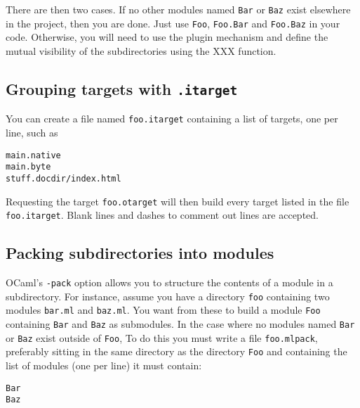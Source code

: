 \documentclass[12pt]{article}
\begin{document}
There are then two cases.  If no other modules named \texttt{Bar} or
\texttt{Baz} exist elsewhere in the project, then you are done.  Just use
\texttt{Foo}, \texttt{Foo.Bar} and \texttt{Foo.Baz} in your code.
Otherwise, you will need to use the plugin mechanism and define the mutual
visibility of the subdirectories using the XXX function.
\subsection{Grouping targets with \texttt{.itarget}}
You can create a file named \texttt{foo.itarget} containing
a list of targets, one per line, such as
\begin{verbatim}
main.native
main.byte
stuff.docdir/index.html
\end{verbatim}
Requesting the target \texttt{foo.otarget} will then build every target
listed in the file \texttt{foo.itarget}.  Blank lines and dashes to comment
out lines are accepted.
\subsection{Packing subdirectories into modules}
OCaml's \texttt{-pack} option allows you to structure the contents of a
module in a subdirectory.  For instance, assume you have a directory
\texttt{foo} containing two modules \texttt{bar.ml} and \texttt{baz.ml}.
You want from these to build a module \texttt{Foo} containing \texttt{Bar}
and \texttt{Baz} as submodules.  In the case where no modules named
\texttt{Bar} or \texttt{Baz} exist outside of \texttt{Foo}, To do this you
must write a file \texttt{foo.mlpack}, preferably sitting in the same
directory as the directory \texttt{Foo} and containing the list of modules
(one per line) it must contain:
\begin{verbatim}
Bar
Baz
\end{verbatim}
\end{document}
